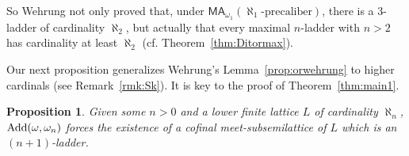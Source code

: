 \documentclass[]{amsart}
\newtheorem{proposition}[theorem]{Proposition}
\theoremstyle{definition}
\theoremstyle{remark}
\begin{document}
So Wehrung not only proved that, under $\mathsf{MA}_{\omega_1}(\aleph_1\text{-precaliber})$, there is a $3$-ladder of cardinality $\aleph_2$, but actually that every maximal $n$-ladder with $n > 2$ has cardinality at least $\aleph_2$ (cf. Theorem~\ref{thm:Ditormax}).

Our next proposition generalizes Wehrung's Lemma~\ref{prop:orwehrung} to higher cardinals (see Remark~\ref{rmk:Sk}). It is key to the proof of Theorem~\ref{thm:main1}. 


\begin{proposition}\label{prop:wehrung}
Given some $n > 0$ and a lower finite lattice $L$ of cardinality $\aleph_n$, $\text{\upshape Add}(\omega, \omega_n)$ forces the existence of a cofinal meet-subsemilattice of $L$ which is an $(n+1)$-ladder.
\end{proposition}
\end{document}
